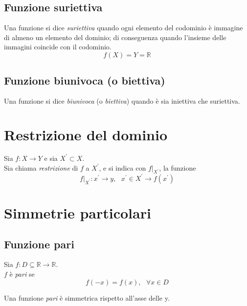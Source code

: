 \documentclass[a4paper,12pt, oneside]{book}
\begin{document}
\subsection{Funzione suriettiva}
\begin{definizione}
	Una funzione si dice \emph{suriettiva} quando ogni elemento del codominio è immagine di almeno un elemento del dominio; di conseguenza quando l’insieme delle immagini coincide con il codominio.
	\begin{equation}
		f(X)=Y=\mathbb{R}
	\end{equation}
\end{definizione}
\subsection{Funzione biunivoca (o biettiva)}
Una funzione si dice \emph{biunivoca} (o \emph{biettiva}) quando è sia iniettiva che suriettiva.
\section{Restrizione del dominio}
\begin{definizione}
	Sia $f:X\rightarrow Y$ e sia $X^{'}\subset X$.\\
	Sia chiama \emph{restrizione} di $f$ a $X^{'}$, e si indica con $f|_{X^{'}}$, la funzione
	\begin{equation}
		f|_{X^{'}}:x^{'}\rightarrow y,\mbox{ } x^{'}\in X^{'} \rightarrow f(x^{'})
	\end{equation}
\end{definizione}
\section{Simmetrie particolari}
\subsection{Funzione pari}
\begin{definizione}
	Sia $f:D\subseteq \mathbb{R} \rightarrow \mathbb{R}$.\\
	$f$ è \emph{pari} se
	\begin{equation}
		f(-x)=f(x), \mbox{ } \forall x \in D
	\end{equation}
\end{definizione}
\begin{nota}
	Una funzione \emph{pari} è simmetrica rispetto all'asse delle y.
\end{nota}
\end{document}
